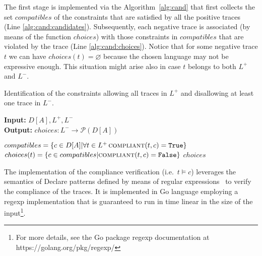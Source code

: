 The first stage is implemented via the Algorithm~\ref{alg:cand} that first collects the set $compatibles$ of the constraints that are satisfied by all the positive traces (Line \ref{alg:cand:candidates}). Subsequently, each negative trace is associated (by means of the function ${choices}$) with those constraints in $compatibles$ that are violated by the trace (Line \ref{alg:cand:choices}). Notice that for some negative trace $t$ we can have $choices(t)=\varnothing$ because the chosen language may not be expressive enough. This situation might arise also in case $t$ belongs to both $L^+$ and $L^-$.
%
\begin{algorithm}
    \caption{Identification of the constraints allowing all traces in $L^+$ and disallowing at least one trace in $L^-$.}
    \label{alg:cand}
    \textbf{Input:}  $D[A], L^+, L^-$\\
    \textbf{Output:} ${choices} : L^- \rightarrow \mathcal{P}({D[A]})$
	\begin{algorithmic}[1] 
   	\State ${compatibles}= \{c \in D[A] | \forall t \in L^+\, \Call{compliant}{t,c} = \texttt{True}\}$ \label{alg:cand:candidates}
		\State ${choices}(t) = \{c \in {compatibles} | \Call{compliant}{t,c} = \texttt{False}\}$\label{alg:cand:choices}
	\EndFor
	\State \Return ${choices}$
    \EndProcedure
    \end{algorithmic}
\end{algorithm}

The implementation of the compliance verification  (i.e.\ $t\models c$) leverages the semantics of Declare patterns defined by means of regular expressions \cite{2017-DiCiccio}%
~to verify the compliance of the traces. It is implemented in Go language employing a regexp implementation that is guaranteed to run in time linear in the size of the input\footnote{For more details, see the Go package regexp documentation at https://golang.org/pkg/regexp/}.
\lstset{language=Prolog}

